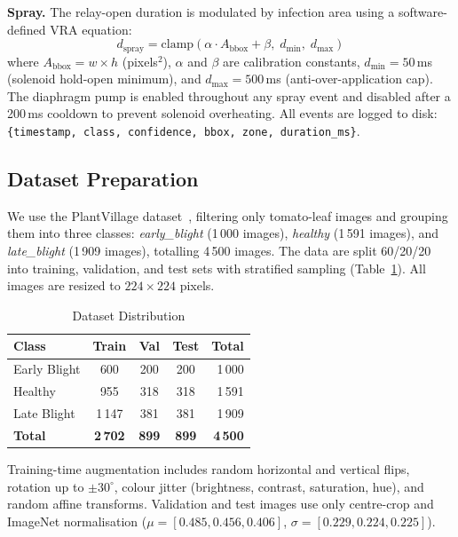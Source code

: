 \documentclass[conference]{IEEEtran}
\begin{document}
\textbf{Spray.} The relay-open duration is modulated by infection area
using a software-defined VRA equation:
\begin{equation}
    d_{\text{spray}} = \mathrm{clamp}\!\left(\alpha \cdot A_{\text{bbox}} + \beta,\;
        d_{\min},\; d_{\max}\right)
    \label{eq:vra}
\end{equation}
where $A_{\text{bbox}} = w \times h$ (pixels$^2$), $\alpha$ and $\beta$
are calibration constants, $d_{\min} = 50$\,ms (solenoid hold-open
minimum), and $d_{\max} = 500$\,ms (anti-over-application cap).
The diaphragm pump is enabled throughout any spray event and disabled
after a 200\,ms cooldown to prevent solenoid overheating. All events are
logged to disk: \texttt{\{timestamp, class, confidence, bbox, zone,
duration\_ms\}}.

\subsection{Dataset Preparation}
\label{sec:dataset}

We use the PlantVillage dataset~\cite{b3}, filtering only tomato-leaf
images and grouping them into three classes: \emph{early\_blight} (1\,000
images), \emph{healthy} (1\,591 images), and \emph{late\_blight} (1\,909
images), totalling 4\,500 images. The data are split 60/20/20 into
training, validation, and test sets with stratified sampling
(Table~\ref{tab:dataset}). All images are resized to $224\times224$
pixels.

\begin{table}[htbp]
\caption{Dataset Distribution}
\label{tab:dataset}
\centering
\begin{tabular}{@{}lcccr@{}}
\toprule
\textbf{Class} & \textbf{Train} & \textbf{Val} & \textbf{Test} & \textbf{Total} \\
\midrule
Early Blight  & 600  & 200 & 200  & 1\,000 \\
Healthy        & 955  & 318 & 318  & 1\,591 \\
Late Blight    & 1\,147 & 381 & 381 & 1\,909 \\
\midrule
\textbf{Total} & \textbf{2\,702} & \textbf{899} & \textbf{899} & \textbf{4\,500} \\
\bottomrule
\end{tabular}
\end{table}

Training-time augmentation includes random horizontal and vertical flips,
rotation up to $\pm30^{\circ}$, colour jitter (brightness, contrast,
saturation, hue), and random affine transforms. Validation and test
images use only centre-crop and ImageNet normalisation
($\mu=[0.485,0.456,0.406]$, $\sigma=[0.229,0.224,0.225]$).
\end{document}
